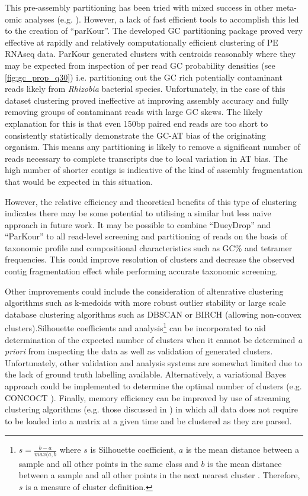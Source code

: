 This pre-assembly partitioning has been tried with mixed success in other meta-omic analyses (e.g. \citep{Droge2012}).
However, a lack of fast efficient tools to accomplish this led to the creation of ``parKour''.
The developed GC partitioning package proved very effective at rapidly and relatively computationally 
efficient clustering of PE RNAseq data. ParKour generated clusters with centroids
reasonably where they may be expected from inspection of per read GC probability densities (see \cref{fig:gc_prop_q30})
i.e. partitioning out the GC rich potentially contaminant reads likely from \textit{Rhizobia}
bacterial species.  Unfortunately, in the case of this dataset clustering proved ineffective
at improving assembly accuracy and fully removing groups of contaminant reads with large GC skews. 
The likely explanation for this is that even 150bp paired end reads are too short to consistently
statistically demonstrate the GC-AT bias of the originating organism. This means any partitioning
is likely to remove a significant number of reads necessary to complete transcripts due to local
variation in AT bias.  The high number of shorter contigs is indicative of the kind of assembly
fragmentation that would be expected in this situation.

However, the relative efficiency and theoretical benefits of this type of clustering indicates there may be
some potential to utilising a similar but less naive approach in future work.
It may be possible to combine ``DueyDrop'' and ``ParKour'' to all
read-level screening and partitioning of reads on the basis of taxonomic profile
and compositional characteristics such as GC\% and tetramer frequencies.
This could improve resolution of clusters and decrease the observed contig fragmentation
effect while performing accurate taxonomic screening. 

Other improvements could include the consideration of altenrative clustering algorithms 
such as k-medoids \citep{Kaufman1987} with more robust outlier stability or large scale
database clustering algorithms such as DBSCAN \citep{Ester1996} or BIRCH \citep{Zhang1996} (allowing non-convex
clusters).Silhouette coefficients and analysis\footnote{
	\(s = \frac{b -a}{max(a,b}\) where \(s\) is Silhouette coefficient, \(a\) is the mean distance
	between a sample and all other points in the same class and \(b\) is the mean distance
	between a sample and all other points in the next nearest cluster \citep{scikit-learn}.  Therefore,
	\(s\) is a measure of cluster definition.}
\citep{Rousseeuw1987} can be incorporated to aid determination of the expected number of clusters when it cannot be determined
\textit{a priori} from inspecting the data as well as validation of generated clusters.  
Unfortunately, other validation and analysis systems are somewhat limited due to the lack of ground truth labelling 
available.  
Alternatively,
a variational Bayes approach could be implemented to determine the optimal number of clusters (e.g. CONCOCT \citep{Alneberg2014}).
Finally, memory efficiency can be improved by use of streaming clustering algorithms (e.g. those discussed in
\citep{OCallaghan2002})
in which all data does not require to be loaded into a matrix at a given time and be clustered
as they are parsed.  

